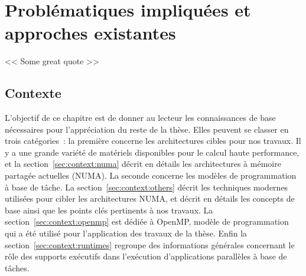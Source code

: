 \part{Problématiques impliquées et approches existantes}

\begin{savequote}[6cm]
<< Some great quote  >>
\end{savequote}
\chapter{Contexte}\label{chap:contexte}
\chaptertoc

\pagebreak

L'objectif de ce chapitre est de donner au lecteur les connaissances de base nécessaires pour l'appréciation du reste de la thèse.
Elles peuvent se classer en trois catégories~: la première concerne les architectures cibles pour nos travaux. Il y a une grande variété de matériels disponibles pour le calcul haute performance, et la section~\ref{sec:context:numa} décrit en détails les architectures à mémoire partagée actuelles (NUMA).
La seconde concerne les modèles de programmation à base de tâche. La section~\ref{sec:context:others} décrit les techniques modernes utilisées pour cibler les architectures NUMA, et décrit en détails les concepts de base ainsi que les points clés pertinents à nos travaux. La section~\ref{sec:context:openmp} est dédiée à OpenMP, modèle de programmation qui a été utilisé pour l'application des travaux de la thèse.
Enfin la section~\ref{sec:context:runtimes} regroupe des informations générales concernant le rôle des supports exécutifs dans l'exécution d'applications parallèles à base de tâches.







